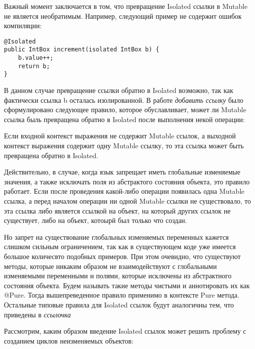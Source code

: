 Важный момент заключается в том, что превращение Isolated ссылки в Mutable не является необратимым. Например, следующий пример не содержит ошибок компиляции:

\begin{lstlisting}[caption=Превращение Isolated ссылки в Mutable и обратно, label=code:isolated_to_mutable_and_back]
@Isolated
public IntBox increment(isolated IntBox b) { 
    b.value++; 
    return b;
}
\end{lstlisting}

В данном случае превращение ссылки обратно в Isolated возможно, так как фактически ссылка b осталась изолированной. В работе \textit{добавить ссылку} было сформулировано следующее правило, которое обуславливает, может ли Mutable ссылка быль превращена обратно в Isolated после выполнения некой операции:

\begin{Rule}\label{rule:convert_isolated}
Если входной контекст выражения не содержит Mutable ссылок, а выходной контекст выражения содержит одну Mutable ссылку, то эта ссылка может быть превращена обратно в Isolated.
\end{Rule}

Действительно, в случае, когда язык запрещает иметь глобальные изменяемые значения, а также исключать поля из абстрактого состояния объекта, это правило работает. Если после проведения какой-либо операции появилась одна Mutable ссылка, а перед началом операции ни одной Mutable ссылки не существовало, то эта ссылка либо является ссылкой на объект, на который других ссылок не существует, либо на объект, котоырй был только что создан. 

Но запрет на существование глобальных изменяемых переменных кажется слишком сильным ограничением, так как в существующем коде уже имеется большое количесвто подобных примеров. При этом очевидно, что существуют методы, которые никаким образом не взаимодействуют с глобальными изменяемыми переменными и полями, которые исключены из абстрактного состояния объекта. Будем называть такие методы чистыми и аннотировать их как @Pure. Тогда вышепреведенное правило применимо в контексте Pure метода. Остальные типовые правила для Isolated ссылок будут аналогичны тем, что приведены в \textit{ссылочка} 

Рассмотрим, каким образом введение Isolated ссылок может решить проблему с созданием циклов неизменяемых объектов:

